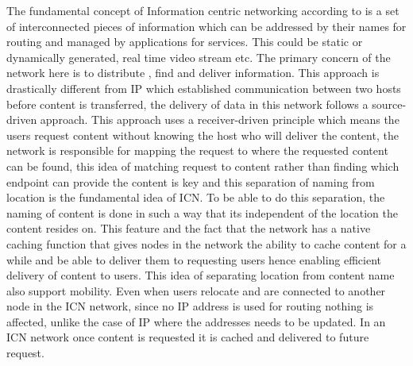The fundamental concept of Information centric networking according to \cite{ahlgrensurvey} is a set of interconnected pieces of information which can be addressed by their names for routing and managed by applications for services. This could be static or dynamically generated, real time video stream etc. The primary concern of the network here is to distribute , find and deliver information. 
This approach is drastically different from IP which established communication between two hosts before content is transferred, the delivery of data in this network follows a source-driven approach. This approach uses a receiver-driven principle which means the users request content without knowing the host who will deliver the content, the network is responsible for mapping the request to where the requested content can be found, this idea of matching request to content rather than finding which endpoint can provide the content is key and this separation of naming from location is the fundamental idea of ICN.
To be able to do this separation, the naming of content is done in such a way that its independent of the location the content resides on. This feature and the fact that the network has a native caching function that gives nodes in the network the ability to cache content for a while and be able to deliver them to requesting users hence enabling efficient delivery of content to users. 
This idea of separating location from content name also support mobility. Even when users relocate and are connected to another node in the ICN network, since no IP address is used for routing nothing is affected, unlike the case of IP where the addresses needs to be updated. In an ICN network once content is requested it is cached and delivered to future request. 























